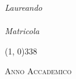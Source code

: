 \begin{titlepage}
\begin{center}
\begin{large}
            \begin{flushright}
                \textit{Laureando}\\
                \vspace{5pt}
                \myName \\
                \vspace{5pt}
                \textit{Matricola} \myID
            \end{flushright}
        \end{large}

        \vspace{40pt}

        \line(1, 0){338} \\
        \begin{normalsize}
            \textsc{Anno Accademico \myAA}
        \end{normalsize}
    \end{center}
\end{titlepage}
